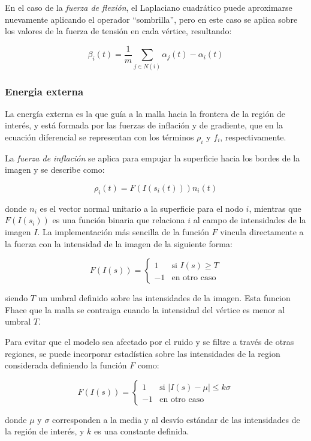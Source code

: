 En el caso de la \emph{fuerza de flexión}, el Laplaciano cuadrático puede aproximarse nuevamente aplicando el operador “sombrilla”, pero en este caso se aplica sobre los valores de la fuerza de tensión en cada vértice, resultando:

$$ \beta_{i}(t) = \dfrac{1}{m} \sum_{j\in N(i)} \alpha_{j}(t) - \alpha_{i}(t)  $$

\subsubsection{Energia externa}\label{section:energia_externa}
La energía externa es la que guía a la malla hacia la frontera de la región de interés, y está formada por las fuerzas de inflación y de gradiente, que en la ecuación diferencial se representan con los términos $\rho_{i}$ y $f_{i}$, respectivamente.

La \emph{fuerza de inflación} se aplica para empujar la superficie hacia los bordes de la imagen y se describe como: 

$$ \rho_{i}(t) = F(I(s_{i}(t))) n_{i}(t) $$

donde $n_{i}$ es el vector normal unitario a la superficie para el nodo $i$, mientras que $F(I(s_{i}))$ es una función binaria que relaciona $i$ al campo de intensidades de la imagen $I$. La implementación más sencilla de la función $F$ vincula directamente a la fuerza con la intensidad de la imagen de la siguiente forma:

$$ F(I(s)) = \begin{cases} 1 & \text{si } I(s) \geq T \\ -1 & \text{en otro caso} \end{cases}  $$

siendo $T$ un umbral definido sobre las intensidades de la imagen. Esta funcion Fhace que la malla se contraiga cuando la intensidad del vértice es menor al umbral $T$.

Para evitar que el modelo sea afectado por el ruido y se filtre a través de otras regiones, se puede incorporar estadística sobre las intensidades de la region considerada \citep{ivins1994statistical} definiendo la función $F$ como:

$$ F(I(s)) = \begin{cases} 1 & \text{si } \left|I(s) - \mu \right| \leq k\sigma \\ -1 & \text{en otro caso} \end{cases} $$

donde $\mu$ y $\sigma$ corresponden a la media y al desvío estándar de las intensidades de la región de interés, y $k$ es una constante definida.

